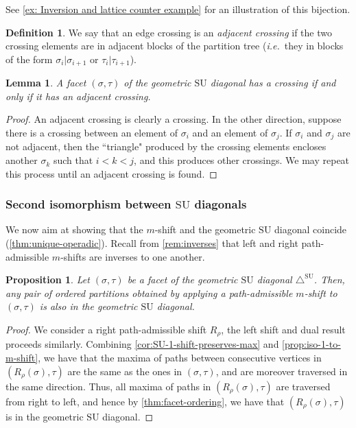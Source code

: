 \documentclass{amsart}
\newcommand{\darkblue}{\color{darkblue}} %
\newtheorem{proposition}[theorem]{Proposition}
\newtheorem{lemma}[theorem]{Lemma}
\theoremstyle{definition}
\newtheorem{definition}[theorem]{Definition}
\newcommand{\ie}{\textit{i.e.}~} %
\newcommand{\defn}[1]{\textsl{\darkblue #1}} %
\newcommand{\SU}{\mathrm{SU}}
\newcommand{\SUD}{\triangle^{\mathrm{SU}}}
\begin{document}
See \cref{ex: Inversion and lattice counter example} for an illustration of this bijection.

\begin{definition}
We say that an edge crossing is an \defn{adjacent crossing} if the two crossing elements are in adjacent blocks of the partition tree (\ie they in blocks of the form $\sigma_i|\sigma_{i+1}$ or $\tau_i|\tau_{i+1}$).
\end{definition}

\begin{lemma}
\label{lem:adjacent-crossing}
A facet $(\sigma,\tau)$ of the geometric $\SU$ diagonal has a crossing if and only if it has an adjacent crossing.
\end{lemma}

\begin{proof}
An adjacent crossing is clearly a crossing. 
In the other direction, suppose there is a crossing between an element of $\sigma_i$ and an element of $\sigma_j$. 
If $\sigma_i$ and $\sigma_j$ are not adjacent, then the ``triangle" produced by the crossing elements encloses another $\sigma_k$ such that $i<k<j$, and this produces other crossings. We may repeat this process until an adjacent crossing is found.
\end{proof}




\subsubsection{Second isomorphism between $\SU$ diagonals}
\label{sec:Iso m-shifts to IJ}

We now aim at showing that the $m$-shift and the geometric $\SU$ diagonal coincide (\cref{thm:unique-operadic}).
Recall from \cref{rem:inverses} that left and right path-admissible $m$-shifts are inverses to one another. 

\begin{proposition} 
\label{lem:IJ-closed-under-shifts}
Let $(\sigma,\tau)$ be a facet of the geometric $\SU$ diagonal $\SUD$.
Then, any pair of ordered partitions obtained by applying a path-admissible $m$-shift to $(\sigma,\tau)$ is also in the geometric $\SU$ diagonal.
\end{proposition}

\begin{proof}
We consider a right path-admissible shift $R_\rho$, the left shift and dual result proceeds similarly. 
Combining \cref{cor:SU-1-shift-preserves-max} and \cref{prop:iso-1-to-m-shift}, we have that the maxima of paths between consecutive vertices in $(R_{\rho}(\sigma),\tau)$ are the same as the ones in $(\sigma,\tau)$, and are moreover traversed in the same direction.
Thus, all maxima of paths in $(R_{\rho}(\sigma),\tau)$ are traversed from right to left, and hence by \cref{thm:facet-ordering}, we have that $(R_{\rho}(\sigma),\tau)$ is in the geometric $\SU$ diagonal.
\end{proof}
\end{document}

